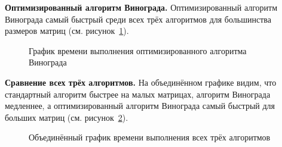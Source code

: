 \textbf{Оптимизированный алгоритм Винограда.}  
Оптимизированный алгоритм Винограда самый быстрый среди всех трёх алгоритмов для большинства размеров матриц (см. рисунок~\ref{pic_vinograd_opt}).

\begin{figure}[H]
	\caption{График времени выполнения оптимизированного алгоритма Винограда}
	\label{pic_vinograd_opt}
\end{figure}

\textbf{Сравнение всех трёх алгоритмов.}  
На объединённом графике видим, что стандартный алгоритм быстрее на малых матрицах, алгоритм Винограда медленнее, а оптимизированный алгоритм Винограда самый быстрый для больших матриц (см. рисунок~\ref{pic_combined}).

\begin{figure}[H]
	\caption{Объединённый график времени выполнения всех трёх алгоритмов}
	\label{pic_combined}
\end{figure}



